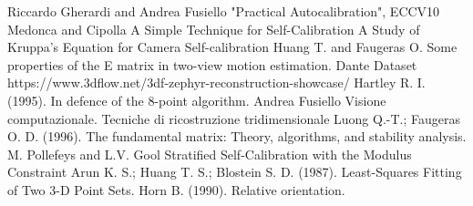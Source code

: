 \documentclass[11pt]{article}
\begin{document}
\begin{thebibliography}{100}
    \addtolength{\leftmargin}{0.2in}
    \setlength{\itemindent}{-0.2in}

     Riccardo Gherardi and Andrea Fusiello "Practical Autocalibration", ECCV10
     Medonca and Cipolla A Simple Technique for Self-Calibration
     A Study of Kruppa’s Equation for Camera Self-calibration
     Huang T. and Faugeras O. Some properties of the E matrix in two-view motion estimation. 
     Dante Dataset https://www.3dflow.net/3df-zephyr-reconstruction-showcase/
     Hartley R. I. (1995). In defence of the 8-point algorithm.
     Andrea Fusiello Visione computazionale. Tecniche di ricostruzione tridimensionale
     Luong Q.-T.; Faugeras O. D. (1996). The fundamental matrix: Theory, algorithms, and stability analysis.
     M. Pollefeys and L.V. Gool Stratified Self-Calibration with the Modulus Constraint
     Arun K. S.; Huang T. S.; Blostein S. D. (1987). Least-Squares Fitting of Two 3-D Point Sets.
     Horn B. (1990). Relative orientation.
\end{thebibliography}
\end{document}
